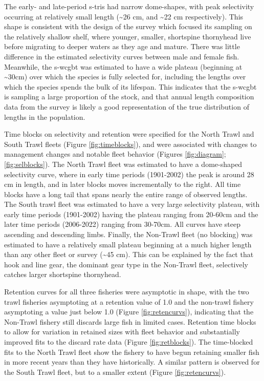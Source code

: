 \documentclass[11pt,
  english,
  letterpaper,
]{article}
\begin{document}
The early- and late-period \gls{s-tri}s had narrow dome-shapes, with peak selectivity occurring at relatively small length (\textasciitilde26 cm, and \textasciitilde22 cm respectively). This shape is consistent with the design of the survey which focused its sampling on the relatively shallow shelf, where younger, smaller, shortspine thornyhead live before migrating to deeper waters as they age and mature. There was little difference in the estimated selectivity curves between male and female fish. Meanwhile, the \gls{s-wcgbt} was estimated to have a wide plateau (beginning at \textasciitilde30cm) over which the species is fully selected for, including the lengths over which the species spends the bulk of its lifespan. This indicates that the \gls{s-wcgbt} is sampling a large proportion of the stock, and that annual length composition data from the survey is likely a good representation of the true distribution of lengths in the population.

Time blocks on selectivity and retention were specified for the North Trawl and South Trawl fleets (Figure \ref{fig:timeblocks}), and were associated with changes to management changes and notable fleet behavior (Figures \ref{fig:diagram}; \ref{fig:selblocks}). The North Trawl fleet was estimated to have a dome-shaped selectivity curve, where in early time periods (1901-2002) the peak is around 28 cm in length, and in later blocks moves incrementally to the right. All time blocks have a long tail that spans nearly the entire range of observed lengths. The South trawl fleet was estimated to have a very large selectivity plateau, with early time periods (1901-2002) having the plateau ranging from 20-60cm and the later time periods (2006-2022) ranging from 30-70cm. All curves have steep ascending and descending limbs. Finally, the Non-Trawl fleet (no blocking) was estimated to have a relatively small plateau beginning at a much higher length than any other fleet or survey (\textasciitilde45 cm). This can be explained by the fact that hook and line gear, the dominant gear type in the Non-Trawl fleet, selectively catches larger shortspine thornyhead.

Retention curves for all three fisheries were asymptotic in shape, with the two trawl fisheries asymptoting at a retention value of 1.0 and the non-trawl fishery asymptoting a value just below 1.0 (Figure \ref{fig:retencurvs}), indicating that the Non-Trawl fishery still discards large fish in limited cases. Retention time blocks to allow for variation in retained sizes with fleet behavior and substantially improved fits to the discard rate data (Figure \ref{fig:retblocks}). The time-blocked fits to the North Trawl fleet show the fishery to have begun retaining smaller fish in more recent years than they have historically. A similar pattern is observed for the South Trawl fleet, but to a smaller extent (Figure \ref{fig:retencurvs}).
\end{document}
